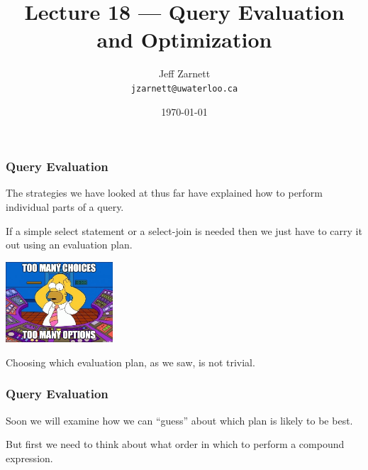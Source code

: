 

\title{Lecture 18 --- Query Evaluation and Optimization}

\author{Jeff Zarnett \\ \small \texttt{jzarnett@uwaterloo.ca}}
\date{\today}




\begin{frame}
  \titlepage

 \end{frame}
 
\begin{frame}
\frametitle{Query Evaluation}

The strategies we have looked at thus far have explained how to perform individual parts of a query. 

If a simple select statement or a select-join is needed then we just have to carry it out using an evaluation plan. 

\begin{center}
	\includegraphics[width=0.3\textwidth]{images/options.jpg}
\end{center}

Choosing which evaluation plan, as we saw, is not trivial. 

 \end{frame}
 
\begin{frame}
\frametitle{Query Evaluation}

Soon we will examine how we can ``guess'' about which plan is likely to be best. 

But first we need to think about what order in which to perform a compound expression.

\end{frame}


